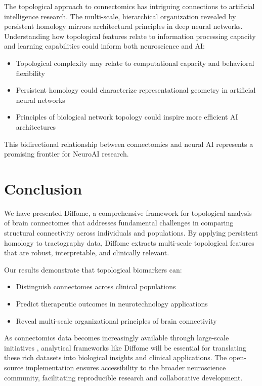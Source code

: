 \documentclass[12pt,a4paper]{article}
\begin{document}
The topological approach to connectomics has intriguing connections to artificial intelligence research. The multi-scale, hierarchical organization revealed by persistent homology mirrors architectural principles in deep neural networks. Understanding how topological features relate to information processing capacity and learning capabilities could inform both neuroscience and AI:

\begin{itemize}
    \item Topological complexity may relate to computational capacity and behavioral flexibility
    \item Persistent homology could characterize representational geometry in artificial neural networks
    \item Principles of biological network topology could inspire more efficient AI architectures
\end{itemize}

This bidirectional relationship between connectomics and neural AI represents a promising frontier for NeuroAI research.

\section{Conclusion}

We have presented Diffome, a comprehensive framework for topological analysis of brain connectomes that addresses fundamental challenges in comparing structural connectivity across individuals and populations. By applying persistent homology to tractography data, Diffome extracts multi-scale topological features that are robust, interpretable, and clinically relevant.

Our results demonstrate that topological biomarkers can:
\begin{itemize}
    \item Distinguish connectomes across clinical populations
    \item Predict therapeutic outcomes in neurotechnology applications
    \item Reveal multi-scale organizational principles of brain connectivity
\end{itemize}

As connectomics data becomes increasingly available through large-scale initiatives \citep{wang2021vivo}, analytical frameworks like Diffome will be essential for translating these rich datasets into biological insights and clinical applications. The open-source implementation ensures accessibility to the broader neuroscience community, facilitating reproducible research and collaborative development.
\end{document}
